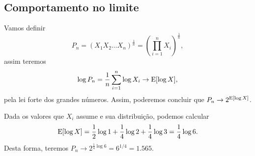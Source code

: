 \subsection{Comportamento no limite}

\begin{questions}

\begin{solution}
Vamos definir
\begin{equation}
P_n = (X_1 X_2 \ldots X_n )^{\frac{1}{n}} = \left( \prod_{i=1}^{n} X_i \right)^{\frac{1}{n}} , 
\end{equation}
assim teremos
\begin{equation}
\log P_n = \frac{1}{n} \sum_{i=1}^{n} \log X_i \rightarrow \mathrm{E} [\log X]  ,
\end{equation}
pela lei forte dos grandes números. Assim, poderemos concluir que
$P_n \rightarrow 2^{\mathrm{E} [\log X]}$.

Dada os valores que $X_i$ assume e sua distribuição, podemos calcular
\begin{equation}
\mathrm{E} [\log X] = \frac{1}{2} \log 1 + \frac{1}{4} \log 2 + \frac{1}{4} \log 3 = \frac{1}{4} \log 6  .
\end{equation}
Desta forma, teremos $P_n \rightarrow 2^{\frac{1}{4} \log 6} = 6^{1/4} = 1.565$.

\end{solution}
\end{questions}
